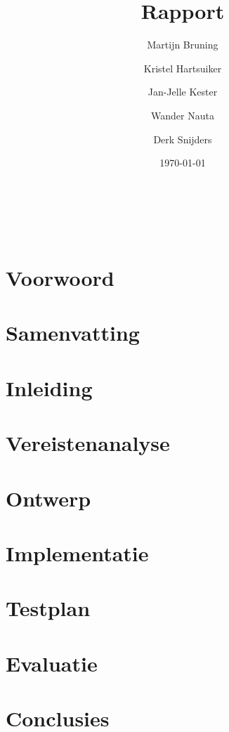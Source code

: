 \documentclass[twoside,openright,parskip]{scrreprt}
\title{Rapport}
\author{
     Martijn Bruning
\and Kristel Hartsuiker
\and Jan-Jelle Kester
\and Wander Nauta
\and Derk Snijders
}
\date{\today}
\begin{document}
\begin{titlepage}
	{\Huge \thetitle} \\
	\vfill
	\theauthor \\
	\thedate
\end{titlepage}

\chapter{Voorwoord}

\lipsum

\chapter{Samenvatting}

\lipsum

\tableofcontents

\chapter{Inleiding}

\lipsum

\chapter{Vereistenanalyse}

\lipsum

\chapter{Ontwerp}

\lipsum

\chapter{Implementatie}

\lipsum

\chapter{Testplan}

\lipsum

\chapter{Evaluatie}

\lipsum

\chapter{Conclusies}
\end{document}
